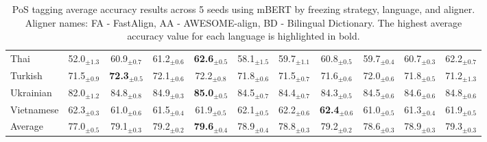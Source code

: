 \begin{table*}[ht]
{\begin{tabular}{lcccccccccc}
Thai & 52.0$_{\pm 1.3}$ & 60.9$_{\pm 0.7}$ & 61.2$_{\pm 0.6}$ & \textbf{62.6}$_{\pm 0.5}$ & 58.1$_{\pm 1.5}$ & 59.7$_{\pm 1.1}$ & 60.8$_{\pm 0.5}$ & 59.7$_{\pm 0.4}$ & 60.7$_{\pm 0.3}$ & 62.2$_{\pm 0.7}$ \\
Turkish & 71.5$_{\pm 0.9}$ & \textbf{72.3}$_{\pm 0.5}$ & 72.1$_{\pm 0.6}$ & 72.2$_{\pm 0.8}$ & 71.8$_{\pm 0.6}$ & 71.5$_{\pm 0.7}$ & 71.6$_{\pm 0.6}$ & 72.0$_{\pm 0.6}$ & 71.8$_{\pm 0.5}$ & 71.2$_{\pm 1.3}$ \\
Ukrainian & 82.0$_{\pm 1.2}$ & 84.8$_{\pm 0.8}$ & 84.9$_{\pm 0.3}$ & \textbf{85.0}$_{\pm 0.5}$ & 84.5$_{\pm 0.7}$ & 84.4$_{\pm 0.7}$ & 84.3$_{\pm 0.5}$ & 84.5$_{\pm 0.6}$ & 84.6$_{\pm 0.6}$ & 84.8$_{\pm 0.6}$ \\
Vietnamese & 62.3$_{\pm 0.3}$ & 61.0$_{\pm 0.6}$ & 61.5$_{\pm 0.4}$ & 61.9$_{\pm 0.5}$ & 62.1$_{\pm 0.5}$ & 62.2$_{\pm 0.6}$ & \textbf{62.4}$_{\pm 0.6}$ & 61.0$_{\pm 0.5}$ & 61.3$_{\pm 0.4}$ & 61.9$_{\pm 0.5}$ \\
\hline
Average & 77.0$_{\pm 0.5}$ & 79.1$_{\pm 0.3}$ & 79.2$_{\pm 0.2}$ & \textbf{79.6}$_{\pm 0.4}$ & 78.9$_{\pm 0.4}$ & 78.8$_{\pm 0.3}$ & 79.2$_{\pm 0.2}$ & 78.6$_{\pm 0.3}$ & 78.9$_{\pm 0.3}$ & 79.3$_{\pm 0.3}$ \\
    \bottomrule
    \end{tabular}
    }
    \caption{PoS tagging average accuracy results across 5 seeds using mBERT by freezing strategy, language, and aligner. Aligner names: FA - FastAlign, AA - AWESOME-align, BD - Bilingual Dictionary. The highest average accuracy value for each language is highlighted in bold.}
    \label{table:results_mBERT_PoS-tagging_before}
    \end{table*}

